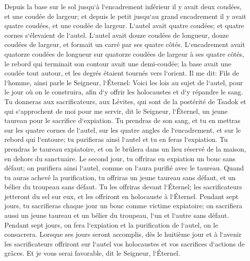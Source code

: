\verse Depuis la base sur le sol jusqu`à l`encadrement inférieur il y avait deux coudées, et une coudée de largeur; et depuis le petit jusqu`au grand encadrement il y avait quatre coudées, et une coudée de largeur. 
\verse L`autel avait quatre coudées; et quatre cornes s`élevaient de l`autel. 
\verse L`autel avait douze coudées de longueur, douze coudées de largeur, et formait un carré par ses quatre côtés. 
\verse L`encadrement avait quatorze coudées de longueur sur quatorze coudées de largeur à ses quatre côtés, le rebord qui terminait son contour avait une demi-coudée; la base avait une coudée tout autour, et les degrés étaient tournés vers l`orient. 
\verse Il me dit: Fils de l`homme, ainsi parle le Seigneur, l`Éternel: Voici les lois au sujet de l`autel, pour le jour où on le construira, afin d`y offrir les holocaustes et d`y répandre le sang. 
\verse Tu donneras aux sacrificateurs, aux Lévites, qui sont de la postérité de Tsadok et qui s`approchent de moi pour me servir, dit le Seigneur, l`Éternel, un jeune taureau pour le sacrifice d`expiation. 
\verse Tu prendras de son sang, et tu en mettras sur les quatre cornes de l`autel, sur les quatre angles de l`encadrement, et sur le rebord qui l`entoure; tu purifieras ainsi l`autel et tu en feras l`expiation. 
\verse Tu prendras le taureau expiatoire, et on le brûlera dans un lieu réservé de la maison, en dehors du sanctuaire. 
\verse Le second jour, tu offriras en expiation un bouc sans défaut; on purifiera ainsi l`autel, comme on l`aura purifié avec le taureau. 
\verse Quand tu auras achevé la purification, tu offriras un jeune taureau sans défaut, et un bélier du troupeau sans défaut. 
\verse Tu les offriras devant l`Éternel; les sacrificateurs jetteront du sel sur eux, et les offriront en holocauste à l`Éternel. 
\verse Pendant sept jours, tu sacrifieras chaque jour un bouc comme victime expiatoire; on sacrifiera aussi un jeune taureau et un bélier du troupeau, l`un et l`autre sans défaut. 
\verse Pendant sept jours, on fera l`expiation et la purification de l`autel, on le consacrera. 
\verse Lorsque ses jours seront accomplis, dès le huitième jour et à l`avenir les sacrificateurs offriront sur l`autel vos holocaustes et vos sacrifices d`actions de grâces. Et je vous serai favorable, dit le Seigneur, l`Éternel. 

